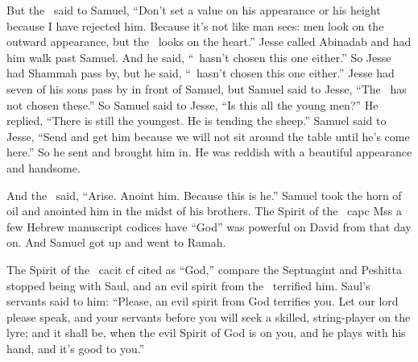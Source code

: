 \begin{inparaenum}
   But the \lord\ said to Samuel, ``Don't set a value on his appearance or his height because I have rejected him. Because it's not like man sees: men look on the outward appearance, but the \lord\ looks on the heart.''%
   Jesse called Abinadab and had him walk past Samuel. And he said, ``\lord\ hasn't chosen this one either.''%
   So Jesse had Shammah pass by, but he said, ``\lord\ hasn't chosen this one either.''%
   Jesse had seven of his sons pass by in front of Samuel, but Samuel said to Jesse, ``The \lord\ has not chosen these.''%
   So Samuel said to Jesse, ``Is this all the young men?'' He replied, ``There is still the youngest. He is tending the sheep.'' Samuel said to Jesse, ``Send and get him because we will not sit around the table until he's come here.''%
   So he sent and brought him in. He was reddish with a beautiful appearance and handsome.%
  
  And the \lord\ said, ``Arise. Anoint him. Because this is he.''%
   Samuel took the horn of oil and anointed him in the midst of his brothers. The Spirit of the \lord\ ca{pc Mss }{a few Hebrew manuscript codices have ``God''} was powerful on David from that day on. And Samuel got up and went to Ramah.%
  
   The Spirit of the \lord\ ca{cit  cf \septuagint{}\peshitta}{cited as ``God,'' compare the Septuagint and Peshitta} stopped being with Saul, and an evil spirit from the \lord\ terrified him.%
   Saul's servants said to him: ``Please, an evil spirit from God terrifies you.%
   Let our lord please speak, and your servants before you will seek a skilled, string-player on the lyre; and it shall be, when the evil Spirit of God is on you, and he plays with his hand, and it's good to you.''%
  

\end{inparaenum}
